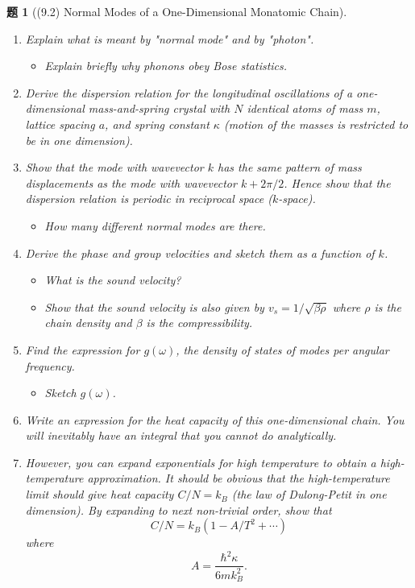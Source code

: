 \documentclass[UTF8,10pt,a4paper]{article}
\theoremstyle{Problem}
\newtheorem{prob}{题}
\theoremstyle{Solution}
\begin{document}
\begin{prob}[(9.2) Normal Modes of a One-Dimensional Monatomic Chain]
    \begin{enumerate}
        \item[(a)$\ddagger$] Explain what is meant by "normal mode" and by "photon".
        \begin{itemize}
            \item[$\triangleright$] Explain briefly why phonons obey Bose statistics.
        \end{itemize}
        \item[(b)$\ddagger$] Derive the dispersion relation for the longitudinal oscillations of a one-dimensional mass-and-spring crystal with $N$ identical atoms of mass $m$, lattice spacing $a$, and spring constant $\kappa$ (motion of the masses is restricted to be in one dimension).
        \item[(c)$\ddagger$] Show that the mode with wavevector $k$ has the same pattern of mass displacements as the mode with wavevector $k+2\pi/2$. Hence show that the dispersion relation is periodic in reciprocal space ($k$-space).
        \begin{itemize}
            \item[$\triangleright$] How many \textit{different} normal modes are there.
        \end{itemize}
        \item[(d)$\ddagger$] Derive the phase and group velocities and sketch them as a function of $k$.
        \begin{itemize}
            \item[$\triangleright$] What is the sound velocity?
            \item[$\triangleright$] Show that the sound velocity is also given by $v_s=1/\sqrt{\beta\rho}$ where $\rho$ is the chain density and $\beta$ is the compressibility.
        \end{itemize}
        \item[(e)] Find the expression for $g(\omega)$, the density of states of modes per angular frequency.
        \begin{itemize}
            \item[$\triangleright$] Sketch $g(\omega)$.
        \end{itemize}
        \item[(f)] Write an expression for the heat capacity of this one-dimensional chain. You will inevitably have an integral that you cannot do analytically.
        \item[(g)$^*$] However, you can expand exponentials for high temperature to obtain a high-temperature approximation. It should be obvious that the high-temperature limit should give heat capacity $C/N=k_B$ (the law of Dulong-Petit in one dimension). By expanding to next non-trivial order, show that
        \[
            C/N=k_B(1-A/T^2+\cdots)
        \]
        where
        \[
            A=\frac{\hbar^2\kappa}{6mk_B^2}.
        \]
    \end{enumerate}
\end{prob}
\end{document}
